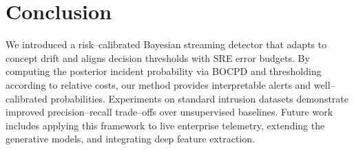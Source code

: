 \documentclass{article}
\begin{document}
\section{Conclusion}
We introduced a risk--calibrated Bayesian streaming detector that adapts to concept drift and aligns decision thresholds with SRE error budgets.  By computing the posterior incident probability via BOCPD and thresholding according to relative costs, our method provides interpretable alerts and well--calibrated probabilities.  Experiments on standard intrusion datasets demonstrate improved precision--recall trade--offs over unsupervised baselines.  Future work includes applying this framework to live enterprise telemetry, extending the generative models, and integrating deep feature extraction.

\clearpage


\end{document}
